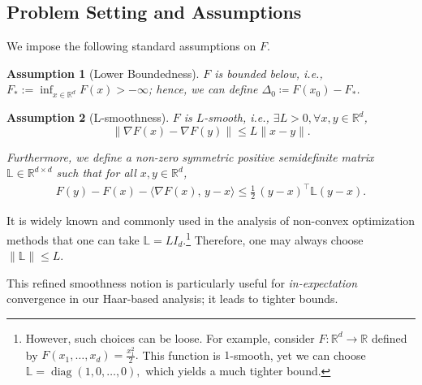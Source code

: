 \documentclass[10pt]{article}
\newtheorem{assumption}[assumption]{Assumption}
\begin{document}
\subsection{Problem Setting and Assumptions}

We impose the following standard assumptions on $F$.
\begin{assumption}[Lower Boundedness]\label{ass:lower}
$F$ is bounded below, i.e., $F_\ast := \inf_{x \in \mathbb{R}^d} F(x)> -\infty$; hence, we can define $\Delta_0 \coloneqq F(x_0) - F_\ast$.
\end{assumption}

\begin{assumption}[L-smoothness]\label{ass:Lsmooth}
$F$ is $L$-smooth, i.e., $\exists L >0,\forall x,y\in\mathbb{R}^d$,
\[
\|\nabla F(x) - \nabla F(y)\| \le L \|x - y\|.
\]

Furthermore, we define a non-zero symmetric positive semidefinite matrix 
$\mathbb{L} \in \mathbb{R}^{d \times d}$ such that for all $x,y \in \mathbb{R}^d$,
\begin{align}\label{onesided-Lplus}
    F(y) - F(x) - \langle \nabla F(x),\, y - x \rangle 
    \le \frac{1}{2}\,(y - x)^\top \mathbb{L} (y - x).
\end{align}
\end{assumption}
It is widely known and commonly used in the analysis of non-convex
optimization methods that one can take $\mathbb{L} = L I_d$.\footnote{
However, such choices can be
loose. For example, consider
$F : \mathbb{R}^d \to \mathbb{R}$ defined by
$F(x_1,\dots,x_d) = \frac{x_1^2}{2}.$
This function is $1$-smooth, yet we can choose
$\mathbb{L} = \operatorname{diag}(1,0,\dots,0),$
which yields a much tighter bound.}
Therefore, one may always choose
$\|\mathbb{L}\|\le L$.


This refined smoothness notion is particularly useful for \emph{in-expectation} convergence in our Haar-based analysis; it leads to tighter bounds.
\end{document}
